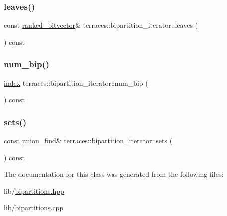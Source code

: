 \subsubsection{\texorpdfstring{leaves()}{leaves()}}
{\footnotesize\ttfamily const \hyperlink{namespaceterraces_acc45ec9c561024c50ecbce5b6738ba08}{ranked\+\_\+bitvector}\& terraces\+::bipartition\+\_\+iterator\+::leaves (\begin{DoxyParamCaption}{ }\end{DoxyParamCaption}) const\hspace{0.3cm}{\ttfamily [inline]}}

\mbox{\label{classterraces_1_1bipartition__iterator_a6faec2db72f4a8faee4d977a18e97540}} 
\subsubsection{\texorpdfstring{num\+\_\+bip()}{num\_bip()}}
{\footnotesize\ttfamily \hyperlink{namespaceterraces_adbc33ccb543d1634e96d0eb02e472c77}{index} terraces\+::bipartition\+\_\+iterator\+::num\+\_\+bip (\begin{DoxyParamCaption}{ }\end{DoxyParamCaption}) const\hspace{0.3cm}{\ttfamily [inline]}}

\mbox{\label{classterraces_1_1bipartition__iterator_adf63f745fee83552648553ddb0530a3b}} 
\subsubsection{\texorpdfstring{sets()}{sets()}}
{\footnotesize\ttfamily const \hyperlink{classterraces_1_1union__find}{union\+\_\+find}\& terraces\+::bipartition\+\_\+iterator\+::sets (\begin{DoxyParamCaption}{ }\end{DoxyParamCaption}) const\hspace{0.3cm}{\ttfamily [inline]}}



The documentation for this class was generated from the following files\+:\begin{DoxyCompactItemize}
\item 
lib/\hyperlink{bipartitions_8hpp}{bipartitions.\+hpp}\item 
lib/\hyperlink{lib_2bipartitions_8cpp}{bipartitions.\+cpp}\end{DoxyCompactItemize}
